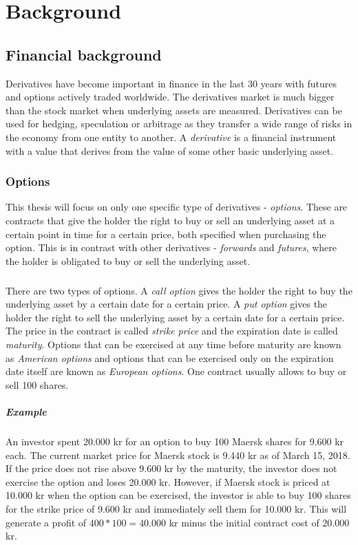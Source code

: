 \chapter{Background}
\label{chapter:background}

\section{Financial background}
Derivatives have become important in finance in the last 30 years with futures and options actively traded worldwide. The derivatives market is much bigger than the stock market when underlying assets are measured. Derivatives can be used for hedging, speculation or arbitrage as they transfer a wide range of risks in the economy from one entity to another. A \textit{derivative} is a financial instrument with a value that derives from the value of some other basic underlying asset.~\cite[pg.1]{ofod}

\subsection{Options}
This thesis will focus on only one specific type of derivatives - \textit{options}. These are contracts that give the holder the right to buy or sell an underlying asset at a certain point in time for a certain price, both specified when purchasing the option. This is in contrast with other derivatives - \textit{forwards} and \textit{futures}, where the holder is obligated to buy or sell the underlying asset. 

\paragraph{}
There are two types of options. A \textit{call option} gives the holder the right to buy the underlying asset by a certain date for a certain price. A \textit{put option} gives the holder the right to sell the underlying asset by a certain date for a certain price. The price in the contract is called \textit{strike price} and the expiration date is called \textit{maturity}. Options that can be exercised at any time before maturity are known as \textit{American options} and options that can be exercised only on the expiration date itself are known as \textit{European options}. One contract usually allows to buy or sell 100 shares.~\cite[pg.7-8]{ofod}
\paragraph{Example}
An investor spent 20.000 kr for an option to buy 100 Maersk shares for 9.600 kr each. The current market price for Maersk stock is 9.440 kr as of March 15, 2018. If the price does not rise above 9.600 kr by the maturity, the investor does not exercise the option and loses 20.000 kr. However, if Maersk stock is priced at 10.000 kr when the option can be exercised, the investor is able to buy 100 shares for the strike price of 9.600 kr and immediately sell them for 10.000 kr. This will generate a profit of $400 * 100 = 40.000$ kr minus the initial contract cost of 20.000 kr.

